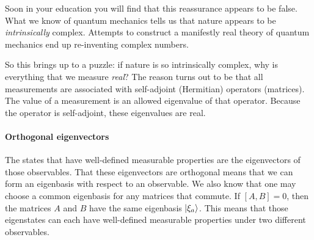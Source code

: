 Soon in your education you will find that this reassurance appears to be false. What we know of quantum mechanics tells us that nature appears to be \emph{intrinsically} complex. Attempts to construct a manifestly real theory of quantum mechanics end up re-inventing complex numbers.

So this brings up to a puzzle: if nature is so intrinsically complex, why is everything that we measure \emph{real}? The reason turns out to be that all measurements are associated with self-adjoint (Hermitian) operators (matrices). The value of a measurement is an allowed eigenvalue of that operator. Because the operator is self-adjoint, these eigenvalues are real. 

\paragraph{Orthogonal eigenvectors} The states that have well-defined measurable properties are the eigenvectors of those observables. That these eigenvectors are orthogonal means that we can form an eigenbasis with respect to an observable. We also know that one may choose a common eigenbasis for any matrices that commute. If $[A,B]=0$, then the matrices $A$ and $B$ have the same eigenbasis $\left|\xi_a\right\rangle$. This means that those eigenstates can each have well-defined measurable properties under two different observables. 
